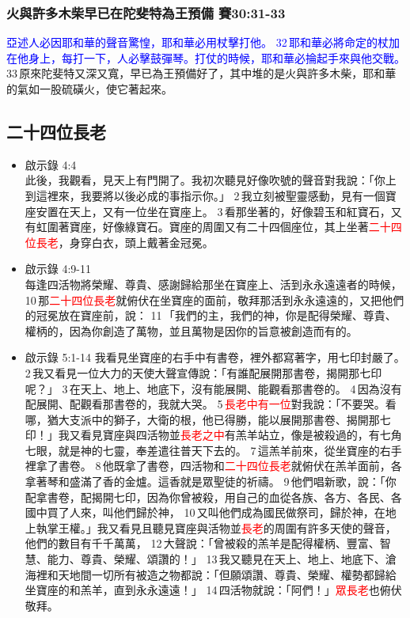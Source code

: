 \subsubsection{火與許多木柴早已在陀斐特為王預備 賽30:31-33}
\textcolor{blue}{亞述人必因耶和華的聲音驚惶，耶和華必用杖擊打他。 32 耶和華必將命定的杖加在他身上，每打一下，人必擊鼓彈琴。打仗的時候，耶和華必掄起手來與他交戰。} 33 原來陀斐特又深又寬，早已為王預備好了，其中堆的是火與許多木柴，耶和華的氣如一股硫磺火，使它著起來。

\subsection{二十四位長老 }
\begin{itemize}
\item 啟示錄 4:4 \\
此後，我觀看，見天上有門開了。我初次聽見好像吹號的聲音對我說：「你上到這裡來，我要將以後必成的事指示你。」 2 我立刻被聖靈感動，見有一個寶座安置在天上，又有一位坐在寶座上。 3 看那坐著的，好像碧玉和紅寶石，又有虹圍著寶座，好像綠寶石。寶座的周圍又有二十四個座位，其上坐著\textcolor{red}{二十四位長老}，身穿白衣，頭上戴著金冠冕。
\item 啟示錄 4:9-11\\
 每逢四活物將榮耀、尊貴、感謝歸給那坐在寶座上、活到永永遠遠者的時候， 10 那\textcolor{red}{二十四位長老}就俯伏在坐寶座的面前，敬拜那活到永永遠遠的，又把他們的冠冕放在寶座前，說： 11 「我們的主，我們的神，你是配得榮耀、尊貴、權柄的，因為你創造了萬物，並且萬物是因你的旨意被創造而有的。
\item 啟示錄 5:1-14 我看見坐寶座的右手中有書卷，裡外都寫著字，用七印封嚴了。 2 我又看見一位大力的天使大聲宣傳說：「有誰配展開那書卷，揭開那七印呢？」 3 在天上、地上、地底下，沒有能展開、能觀看那書卷的。 4 因為沒有配展開、配觀看那書卷的，我就大哭。 5 \textcolor{red}{長老中有一位}對我說：「不要哭。看哪，猶大支派中的獅子，大衛的根，他已得勝，能以展開那書卷、揭開那七印！」我又看見寶座與四活物並\textcolor{red}{長老之中}有羔羊站立，像是被殺過的，有七角七眼，就是神的七靈，奉差遣往普天下去的。 7 這羔羊前來，從坐寶座的右手裡拿了書卷。 8 他既拿了書卷，四活物和\textcolor{red}{二十四位長老}就俯伏在羔羊面前，各拿著琴和盛滿了香的金爐。這香就是眾聖徒的祈禱。 9 他們唱新歌，說：「你配拿書卷，配揭開七印，因為你曾被殺，用自己的血從各族、各方、各民、各國中買了人來，叫他們歸於神， 10 又叫他們成為國民做祭司，歸於神，在地上執掌王權。」我又看見且聽見寶座與活物並\textcolor{red}{長老}的周圍有許多天使的聲音，他們的數目有千千萬萬， 12 大聲說：「曾被殺的羔羊是配得權柄、豐富、智慧、能力、尊貴、榮耀、頌讚的！」 13 我又聽見在天上、地上、地底下、滄海裡和天地間一切所有被造之物都說：「但願頌讚、尊貴、榮耀、權勢都歸給坐寶座的和羔羊，直到永永遠遠！」 14 四活物就說：「阿們！」\textcolor{red}{眾長老}也俯伏敬拜。

\end{itemize}
